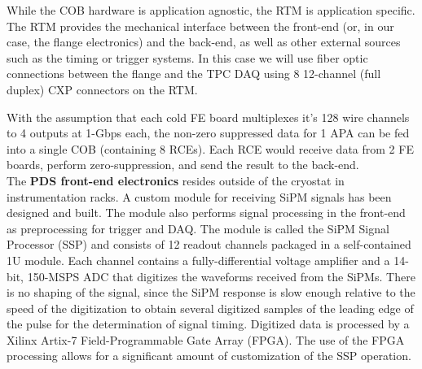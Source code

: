 While the COB hardware is application agnostic, the RTM is application specific.
The RTM provides the mechanical interface between the front-end (or, in our case, the flange electronics)
and the back-end, as well as other external sources such as the timing or trigger systems.
In this case we will use fiber optic connections between the flange and the TPC DAQ using 8 12-channel (full duplex)
CXP connectors on the RTM. 

With the assumption that each cold FE board multiplexes it's 128 wire channels to 4 outputs at 1-Gbps each,
the non-zero suppressed data for 1 APA can be fed into a single COB (containing 8 RCEs).
Each RCE would receive data from 2 FE boards, perform zero-suppression, and send the result to the back-end.  \\


The {\bf PDS front-end electronics} resides outside of the cryostat in
instrumentation racks. A custom module for receiving SiPM signals has
been designed and built. The module also performs signal processing in
the front-end as preprocessing for trigger and DAQ.  The module is
called the SiPM Signal Processor (SSP) and consists of 12 readout
channels packaged in a self-contained 1U module.  Each channel
contains a fully-differential voltage amplifier and a 14-bit, 150-MSPS
ADC that digitizes the waveforms received from the SiPMs. There is no shaping of the signal, since the
SiPM response is slow enough relative to the speed of the digitization
to obtain several digitized samples of the leading edge of the pulse
for the determination of signal timing. Digitized data is processed by
a Xilinx Artix-7 Field-Programmable Gate Array (FPGA).  The use of the
FPGA processing allows for a significant amount of customization of
the SSP operation. \\






